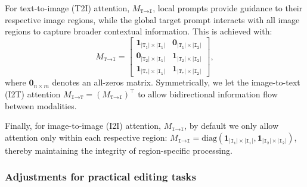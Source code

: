 \documentclass{article}
\begin{document}
For text-to-image (T2I) attention, $M_{\texttt{T}\to\texttt{I}}$, local prompts provide guidance to their respective image regions, while the global target prompt interacts with all image regions to capture broader contextual information. This is achieved with:
\begin{equation}
    M_{\texttt{T}\to\texttt{I}} = \begin{bmatrix}
        \mathbf{1}_{|\texttt{T}_\texttt{1}|\times|\texttt{I}_\texttt{1}|} &  \mathbf{0}_{|\texttt{T}_\texttt{1}|\times|\texttt{I}_\texttt{2}|}\\
        \mathbf{0}_{|\texttt{T}_\texttt{2}|\times|\texttt{I}_\texttt{1}|} &  \mathbf{1}_{|\texttt{T}_\texttt{2}|\times|\texttt{I}_\texttt{2}|}\\
         \mathbf{1}_{|\texttt{T}_\texttt{*}|\times|\texttt{I}_\texttt{1}|} &  \mathbf{1}_{|\texttt{T}_\texttt{*}|\times|\texttt{I}_\texttt{2}|}
    \end{bmatrix},
\end{equation}
where $\mathbf{0}_{n \times m}$ denotes an all-zeros matrix. Symmetrically, we let the image-to-text (I2T) attention $M_{\texttt{I}\to\texttt{T}}=(M_{\texttt{T}\to\texttt{I}})^\top$ to allow bidirectional information flow between modalities.

Finally, for image-to-image (I2I) attention, $M_{\texttt{I}\to\texttt{I}}$, by default we only allow attention only within each respective region: $M_{\texttt{I}\to\texttt{I}}=\mathrm{diag}(\mathbf{1}_{|\texttt{I}_\texttt{1}| \times |\texttt{I}_\texttt{1}|}, \mathbf{1}_{|\texttt{I}_\texttt{2}| \times |\texttt{I}_\texttt{2}|})$, thereby maintaining the integrity of region-specific processing.

\subsubsection{Adjustments for practical editing tasks}
\end{document}

